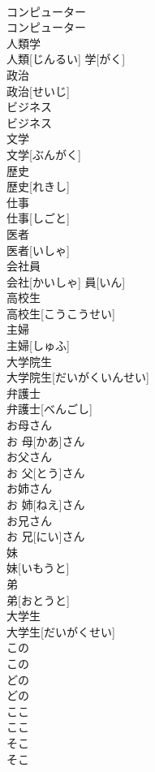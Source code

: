 \documentclass[8pt]{extreport}
\begin{document}
\begin{CJK}{UTF8}{min}
\\	コンピューター	
\\	コンピューター		
\\	人類学	
\\	人類[じんるい] 学[がく]		
\\	政治	
\\	政治[せいじ]		
\\	ビジネス	
\\	ビジネス		
\\	文学	
\\	文学[ぶんがく]		
\\	歴史	
\\	歴史[れきし]		
\\	仕事	
\\	仕事[しごと]		
\\	医者	
\\	医者[いしゃ]		
\\	会社員	
\\	会社[かいしゃ] 員[いん]		
\\	高校生	
\\	高校生[こうこうせい]		
\\	主婦	
\\	主婦[しゅふ]		
\\	大学院生	
\\	大学院生[だいがくいんせい]		
\\	弁護士	
\\	弁護士[べんごし]		
\\	お母さん	
\\	お 母[かあ]さん		
\\	お父さん	
\\	お 父[とう]さん		
\\	お姉さん	
\\	お 姉[ねえ]さん		
\\	お兄さん	
\\	お 兄[にい]さん		
\\	妹	
\\	妹[いもうと]		
\\	弟	
\\	弟[おとうと]		
\\	大学生	
\\	大学生[だいがくせい]		
\\	この	
\\	この		
\\	どの	
\\	どの		
\\	ここ	
\\	ここ		
\\	そこ	
\\	そこ		

\end{CJK}
\end{document}

